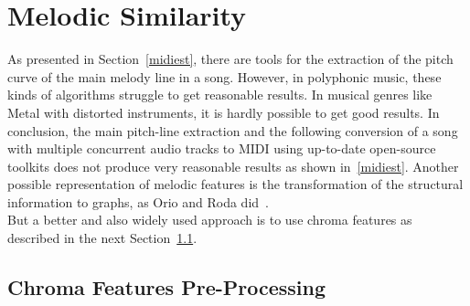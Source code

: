 \section{Melodic Similarity}\label{melsimc}

As presented in Section~\ref{midiest}, there are tools for the extraction of the pitch curve of the main melody line in a song. However, in polyphonic music, these kinds of algorithms struggle to get reasonable results. %
In musical genres like Metal with distorted instruments, it is hardly possible to get good results. 
In conclusion, the main pitch-line extraction and the following conversion of a song with multiple concurrent audio tracks to MIDI using up-to-date open-source toolkits does not produce very reasonable results as shown in~\ref{midiest}.
Another possible representation of melodic features is the transformation of the structural information to graphs, as Orio and Roda did~\cite{graph1}.\\ 
But a better and also widely used approach is to use chroma features as described in the next Section~\ref{chromafeat}.

\subsection{Chroma Features Pre-Processing}\label{chromafeat}

